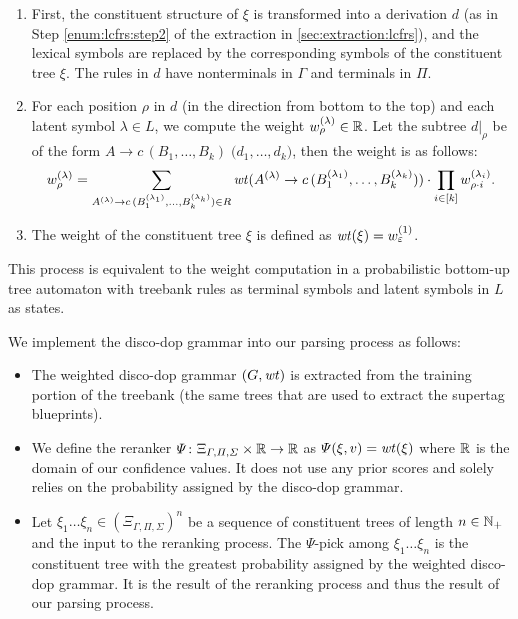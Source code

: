 \documentclass[../../document.tex]{subfiles}
\begin{document}
    \begin{enumerate}
        \item First, the constituent structure of \(\xi\) is transformed into a  derivation \(d\) (as in Step \ref{enum:lcfrs:step2} of the extraction in \cref{sec:extraction:lcfrs}), and the lexical symbols are replaced by the corresponding  symbols of the constituent tree \(\xi\). The rules in \(d\) have nonterminals in \(\varGamma\) and terminals in \(\varPi\).
        \item For each position \(\rho\) in \(d\) (in the direction from bottom to the top) and each latent symbol \(\lambda \in L\), we compute the weight \(w_\rho^{(\lambda)} \in \mathbb{R}\). Let the subtree \(d|_\rho\) be of the form \(A \to c\,(B_1, \ldots, B_k)\;\big(d_1, \ldots, d_k)\), then the weight is as follows:
            \[
                w_\rho^{(\lambda)} = \sum_{A^{(\lambda)} \to c\,(B_1^{(\lambda_1)}, \ldots, B_k^{(\lambda_k)}) \in R} \mathit{wt}(A^{(\lambda)} \to c\,(B_1^{(\lambda_1)}, \ldots, B_k^{(\lambda_k)})) \cdot \prod_{i \in [k]} w_{\rho\cdot i}^{(\lambda_i)} \text{.}
            \]
        \item The weight of the constituent tree \(\xi\) is defined as \(\mathit{wt}(\xi) = w_\varepsilon^{(1)}\).
    \end{enumerate}
    This process is equivalent to the weight computation in a probabilistic bottom-up tree automaton with treebank  rules as terminal symbols and latent symbols in \(L\) as states.
    
    We implement the disco-dop grammar into our parsing process as follows:
    \begin{itemize}
        \item The weighted disco-dop grammar \((G,\mathit{wt})\) is extracted from the training portion of the treebank (the same trees that are used to extract the supertag blueprints).
        \item We define the reranker \(\varPsi\colon \Xi_{\varGamma, \varPi, \varSigma} \times \mathbb{R} \to \mathbb{R}\) as \(\varPsi(\xi, v) = \mathit{wt}(\xi)\) where \(\mathbb{R}\) is the domain of our confidence values. It does not use any prior scores and solely relies on the probability assigned by the disco-dop grammar.
        \item Let \(\xi_1 \ldots \xi_n \in {(\Xi_{\varGamma, \varPi, \varSigma})}^n\) be a sequence of constituent trees of length \(n\in \mathbb{N}_+\) and the input to the reranking process.
        The \(\varPsi\)-pick among \(\xi_1 \ldots \xi_n\) is the constituent tree with the greatest probability assigned by the weighted disco-dop grammar.
        It is the result of the reranking process and thus the result of our parsing process.
    \end{itemize}
\end{document}
